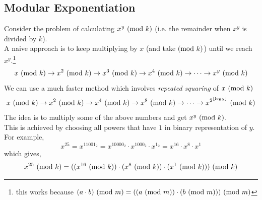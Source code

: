 \documentclass[../../Problems]{subfiles}
\begin{document}
\recalctypearea
\subsection{Modular Exponentiation}
Consider the problem of calculating $x^y\ (\mathrm{mod}\ k)$ (i.e. the remainder when $x^y$ is divided by $k$).\\
A naive approach is to keep multiplying by $x$ (and take$\ (\mathrm{mod}\ k)$) until we reach $x^y$.\footnote{this works because $(a\cdot b)\ (\mathrm{mod}\ m) =  ((a\ (\mathrm{mod}\ m))\cdot(b\ (\mathrm{mod}\ m)))\ (\mathrm{mod}\ m)$}
\begin{equation*}
x \ (\mathrm{mod}\ k) \rightarrow x^2 \ (\mathrm{mod}\ k) \rightarrow x^3 \ (\mathrm{mod}\ k) \rightarrow x^4 \ (\mathrm{mod}\ k) \rightarrow \cdots \rightarrow x^y \ (\mathrm{mod}\ k)
\end{equation*}
We can use a much faster method which involves \emph{repeated squaring} of $x \ (\mathrm{mod}\ k)$
\begin{equation}
x \ (\mathrm{mod}\ k) \rightarrow x^2 \ (\mathrm{mod}\ k) \rightarrow x^4 \ (\mathrm{mod}\ k) \rightarrow x^8 \ (\mathrm{mod}\ k) \rightarrow \cdots \rightarrow x^{2^{\lfloor\log y\rfloor}} \ (\mathrm{mod}\ k)
\end{equation}
The idea is to multiply some of the above numbers and get $x^y \ (\mathrm{mod}\ k)$.\\
This is achieved by choosing all powers that have $1$ in binary representation of $y$.\\
For example,
\begin{equation*}
x^{25} = x ^ {11001_2} = x ^ {10000_2} \cdot x ^ {1000_2} \cdot x ^ {1_2} = x ^ {16} \cdot x ^ 8 \cdot x ^ 1
\end{equation*}
which gives,
\begin{equation*}
x^{25} \ (\mathrm{mod}\ k)  = ((x ^ {16} \ (\mathrm{mod}\ k))\cdot (x ^ 8\ (\mathrm{mod}\ k))  \cdot (x ^ 1\ (\mathrm{mod}\ k))) \ (\mathrm{mod}\ k)
\end{equation*}
\end{document}
